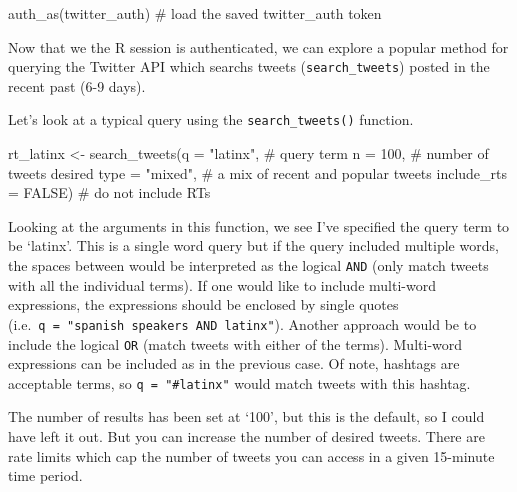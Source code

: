 \documentclass[
  letterpaper,
]{latex/krantz}
\newenvironment{Shaded}{\begin{snugshade}}{\end{snugshade}}
\newcommand{\AttributeTok}[1]{\textcolor[rgb]{0.40,0.45,0.13}{#1}}
\newcommand{\CommentTok}[1]{\textcolor[rgb]{0.37,0.37,0.37}{#1}}
\newcommand{\ConstantTok}[1]{\textcolor[rgb]{0.56,0.35,0.01}{#1}}
\newcommand{\DecValTok}[1]{\textcolor[rgb]{0.68,0.00,0.00}{#1}}
\newcommand{\FunctionTok}[1]{\textcolor[rgb]{0.28,0.35,0.67}{#1}}
\newcommand{\NormalTok}[1]{\textcolor[rgb]{0.00,0.23,0.31}{#1}}
\newcommand{\OtherTok}[1]{\textcolor[rgb]{0.00,0.23,0.31}{#1}}
\newcommand{\StringTok}[1]{\textcolor[rgb]{0.13,0.47,0.30}{#1}}
\begin{document}
\begin{Shaded}
\begin{Highlighting}[]
\FunctionTok{auth\_as}\NormalTok{(twitter\_auth) }\CommentTok{\# load the saved \textasciigrave{}twitter\_auth\textasciigrave{} token}
\end{Highlighting}
\end{Shaded}

Now that we the R session is authenticated, we can explore a popular
method for querying the Twitter API which searchs tweets
(\texttt{search\_tweets}) posted in the recent past (6-9 days).

Let's look at a typical query using the \texttt{search\_tweets()}
function.

\begin{Shaded}
\begin{Highlighting}[]
\NormalTok{rt\_latinx }\OtherTok{\textless{}{-}} 
  \FunctionTok{search\_tweets}\NormalTok{(}\AttributeTok{q =} \StringTok{"latinx"}\NormalTok{, }\CommentTok{\# query term}
                \AttributeTok{n =} \DecValTok{100}\NormalTok{, }\CommentTok{\# number of tweets desired}
                \AttributeTok{type =} \StringTok{"mixed"}\NormalTok{, }\CommentTok{\# a mix of \textasciigrave{}recent\textasciigrave{} and \textasciigrave{}popular\textasciigrave{} tweets}
                \AttributeTok{include\_rts =} \ConstantTok{FALSE}\NormalTok{) }\CommentTok{\# do not include RTs}
\end{Highlighting}
\end{Shaded}

Looking at the arguments in this function, we see I've specified the
query term to be `latinx'. This is a single word query but if the query
included multiple words, the spaces between would be interpreted as the
logical \texttt{AND} (only match tweets with all the individual terms).
If one would like to include multi-word expressions, the expressions
should be enclosed by single quotes
(i.e.~\texttt{q\ =\ "\textquotesingle{}spanish\ speakers\textquotesingle{}\ AND\ latinx"}).
Another approach would be to include the logical \texttt{OR} (match
tweets with either of the terms). Multi-word expressions can be included
as in the previous case. Of note, hashtags are acceptable terms, so
\texttt{q\ =\ "\#latinx"} would match tweets with this hashtag.

The number of results has been set at `100', but this is the default, so
I could have left it out. But you can increase the number of desired
tweets. There are rate limits which cap the number of tweets you can
access in a given 15-minute time period.
\end{document}

